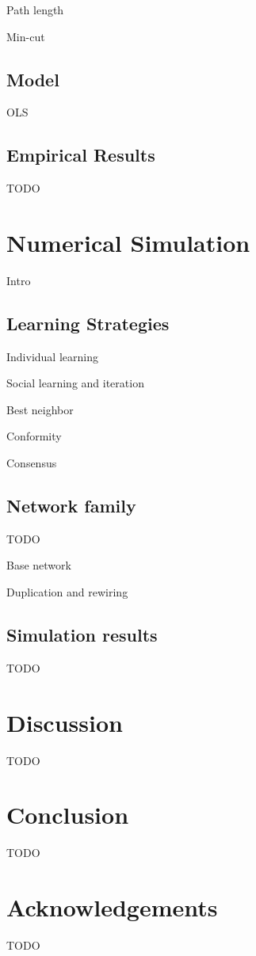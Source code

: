 \documentclass[10pt,twocolumn]{article}
\begin{document}
Path length

Min-cut

\subsection{Model}

OLS

\subsection{Empirical Results}

TODO

\section{Numerical Simulation}

Intro

\subsection{Learning Strategies}

Individual learning

Social learning and iteration

Best neighbor

Conformity

Consensus

\subsection{Network family}

TODO

Base network

Duplication and rewiring

\subsection{Simulation results}

TODO

\section{Discussion}
TODO

\section{Conclusion}
TODO

\section{Acknowledgements}
TODO

%



 
\end{document}
